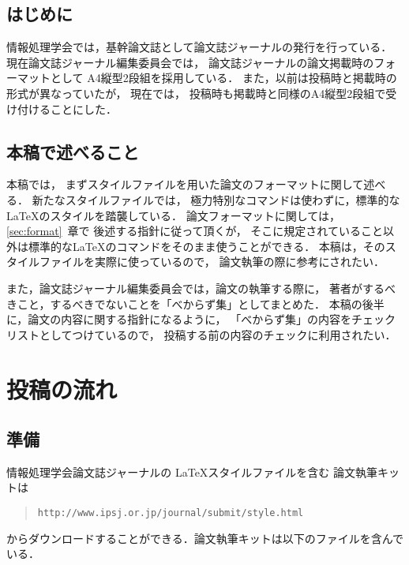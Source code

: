 \documentclass[submit]{ipsj}
\def\|{\verb|}
\begin{document}
\subsection{はじめに}

情報処理学会では，基幹論文誌として論文誌ジャーナルの発行を行っている．
現在論文誌ジャーナル編集委員会では，
論文誌ジャーナルの論文掲載時のフォーマットとして
A4縦型2段組を採用している．
また，以前は投稿時と掲載時の形式が異なっていたが，
現在では，
投稿時も掲載時と同様のA4縦型2段組で受け付けることにした．


\subsection{本稿で述べること}
本稿では，
まずスタイルファイルを用いた論文のフォーマットに関して述べる．
新たなスタイルファイルでは，
極力特別なコマンドは使わずに，標準的な \LaTeX のスタイルを踏襲している．
論文フォーマットに関しては，\ref{sec:format}~章で
後述する指針に従って頂くが，
そこに規定されていること以外は標準的な\LaTeX のコマンドをそのまま使うことができる．
本稿は，そのスタイルファイルを実際に使っているので，
論文執筆の際に参考にされたい．





また，論文誌ジャーナル編集委員会では，論文の執筆する際に，
著者がするべきこと，するべきでないことを「べからず集」としてまとめた．
本稿の後半に，論文の内容に関する指針になるように，
「べからず集」の内容をチェックリストとしてつけているので，
投稿する前の内容のチェックに利用されたい．




%2
\section{投稿の流れ}


%2.1
\subsection{準備}


情報処理学会論文誌ジャーナルの \LaTeX スタイルファイルを含む
論文執筆キットは
\begin{quote}
\small
\|http://www.ipsj.or.jp/journal/submit/style.html|
\end{quote}
からダウンロードすることができる．論文執筆キットは以下のファイルを含んでいる．
\end{document}
